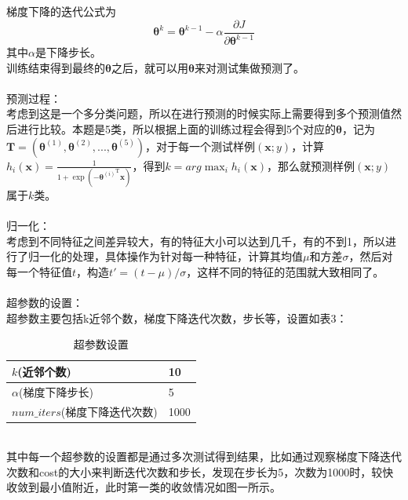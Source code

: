 \documentclass[a4paper,UTF8]{article}
\numberwithin{equation}{section}
\begin{document}
梯度下降的迭代公式为
\begin{equation}
\boldsymbol{\theta}^k = \boldsymbol{\theta}^{k-1} - \alpha\frac{\partial J}{\partial \boldsymbol{\theta}^{k-1}}
\end{equation}
其中$\alpha$是下降步长。\\
训练结束得到最终的$\boldsymbol{\theta}$之后，就可以用$\boldsymbol{\theta}$来对测试集做预测了。\\\\
预测过程：\\
考虑到这是一个多分类问题，所以在进行预测的时候实际上需要得到多个预测值然后进行比较。本题是5类，所以根据上面的训练过程会得到5个对应的$\boldsymbol{\theta}$，记为$\mathbf{T} = (\boldsymbol{\theta}^{(1)}, \boldsymbol{\theta}^{(2)}, ..., \boldsymbol{\theta}^{(5)})$，对于每一个测试样例$(\mathbf{x}; y)$，计算$h_i(\mathbf{x}) = \frac{1}{1 + \exp(-{\boldsymbol{\theta}^{(i)}}^\mathrm{T}\mathbf{x})}$，得到$k=arg \max_i h_i(\mathbf{x})$，那么就预测样例$(\mathbf{x}; y)$属于$k$类。\\\\
归一化：\\
考虑到不同特征之间差异较大，有的特征大小可以达到几千，有的不到1，所以进行了归一化的处理，具体操作为针对每一种特征，计算其均值$\mu$和方差$\sigma$，然后对每一个特征值$t$，构造$t' = (t-\mu)/\sigma$，这样不同的特征的范围就大致相同了。\\\\
超参数的设置：\\
超参数主要包括k近邻个数，梯度下降迭代次数，步长等，设置如表3：
\begin{table}[!htbp]
	\centering
	\caption{超参数设置}
	\label{my-label}
	\begin{tabular}{|l|l|}
		\hline
		$k$(近邻个数)          & 10    \\ \hline
		$\alpha$(梯度下降步长)     & 5    \\ \hline
		$num\_iters$(梯度下降迭代次数) & 1000 \\ \hline
	\end{tabular}
\end{table}\\
其中每一个超参数的设置都是通过多次测试得到结果，比如通过观察梯度下降迭代次数和cost的大小来判断迭代次数和步长，发现在步长为5，次数为1000时，较快收敛到最小值附近，此时第一类的收敛情况如图一所示。\\
\end{document}
